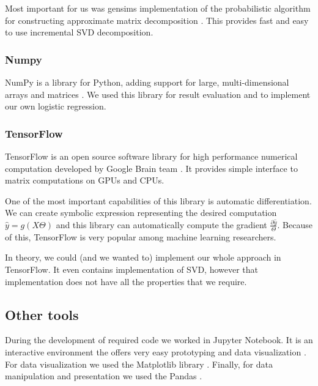     Most important for us was gensims implementation of the probabilistic algorithm for constructing approximate matrix decomposition \cite{halko2011finding}.
    This provides fast and easy to use incremental SVD decomposition.
    
    \subsubsection{Numpy}
    
    NumPy is a library for Python, adding support for large, multi-dimensional arrays and matrices \cite{oliphant2006guide}. %
    We used this library for result evaluation and to implement our own logistic regression.
    
    \subsubsection{TensorFlow}
    
    TensorFlow is an open source software library for high performance numerical computation developed by Google Brain team \cite{tensorflow2015-whitepaper}. 
    It provides simple interface to matrix computations on GPUs and CPUs.
    
    One of the most important capabilities of this library is automatic differentiation.
    We can create symbolic expression representing the desired computation $\hat{y}=g(X\Theta)$ and this library can automatically compute the gradient $\frac{\partial \hat{y}}{\Theta}$.
    Because of this, TensorFlow is very popular among  machine learning researchers.
    
    In theory, we could (and we wanted to) implement our whole approach in TensorFlow.
    It even contains implementation of SVD, however that implementation does not have all the properties that we require.
    
    \subsection{Other tools}
    
    During the development of required code we worked in Jupyter Notebook. 
    It is an interactive environment the offers very easy prototyping and
    data visualization \cite{PER-GRA:2007}. %
    For data visualization we used the Matplotlib library \cite{hunter2007matplotlib}. %
    Finally, for data manipulation and presentation we used the Pandas \cite{mckinney2010data}. %
    
